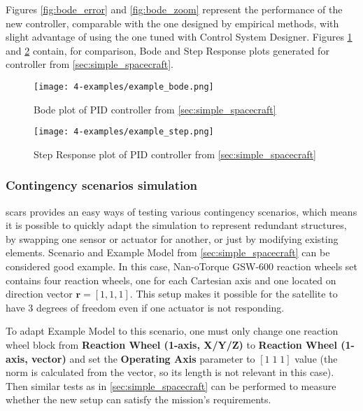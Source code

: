         Figures \ref{fig:bode_error} and \ref{fig:bode_zoom} represent the performance of the new controller, comparable with the one designed by empirical methods, with slight advantage of using the one tuned with Control System Designer. Figures \ref{fig:example_bode} and \ref{fig:example_step} contain, for comparison, Bode and Step Response plots generated for controller from \autoref{sec:simple_spacecraft}.

        \begin{figure}[H]
            \centering
            \texttt{[image: 4-examples/example\_bode.png]}
            \caption{Bode plot of PID controller from \autoref{sec:simple_spacecraft}}
            \label{fig:example_bode}
        \end{figure}

        \begin{figure}[H]
            \centering
            \texttt{[image: 4-examples/example\_step.png]}
            \caption{Step Response plot of PID controller from \autoref{sec:simple_spacecraft}}
            \label{fig:example_step}
        \end{figure}




        

    \subsubsection{Contingency scenarios simulation}
        \ac{scars} provides an easy ways of testing various contingency scenarios, which means it is possible to quickly adapt the simulation to represent redundant structures, by swapping one sensor or actuator for another, or just by modifying existing elements. Scenario and Example Model from \autoref{sec:simple_spacecraft} can be considered good example. In this case, Nan-oTorque GSW-600 reaction wheels set contains four reaction wheels, one for each Cartesian axis and one located on direction vector $\textbf{r} = [1, 1, 1]$. This setup makes it possible for the satellite to have 3 degrees of freedom even if one actuator is not responding.

        To adapt Example Model to this scenario, one must only change one reaction wheel block from \textbf{Reaction Wheel (1-axis, X/Y/Z)} to \textbf{Reaction Wheel (1-axis, vector)} and set the \textbf{Operating Axis} parameter to $[1\; 1\; 1]$ value (the norm is calculated from the vector, so its length is not relevant in this case). Then similar tests as in \autoref{sec:simple_spacecraft} can be performed to measure whether the new setup can satisfy the mission's requirements.
